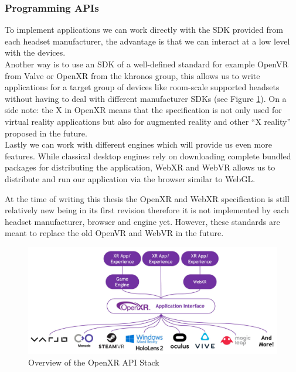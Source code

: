 \subsubsection{Programming APIs}

To implement applications we can work directly with the SDK provided from each headset manufacturer, the advantage is that we can interact at a low level with the devices.\\ 
Another way is to use an SDK of a well-defined standard for example OpenVR from Valve or OpenXR from the khronos group, this allows us to write applications for a target group of devices like room-scale supported headsets without having to deal with different manufacturer SDKs (see Figure \ref{fig:openxr-overview}). On a side note: the X in OpenXR means that the specification is not only used for virtual reality applications but also for augmented reality and other “X reality” proposed in the future.\\
Lastly we can work with different engines which will provide us even more features. While classical desktop engines rely on downloading complete bundled packages for distributing the application, WebXR and WebVR allows us to distribute and run our application via the browser similar to WebGL.

At the time of writing this thesis the OpenXR and WebXR specification is still relatively new being in its first revision therefore it is not implemented by each headset manufacturer, browser and engine yet. However, these standards are meant to replace the old OpenVR and WebVR in the future.  

\begin{figure}[h]
    \centering
    \includegraphics[width=\textwidth]{graphics/openXR-overview.jpg}
    \caption{Overview of the OpenXR API Stack \cite{khronosGroupOpenXR}}
    \label{fig:openxr-overview}
\end{figure}